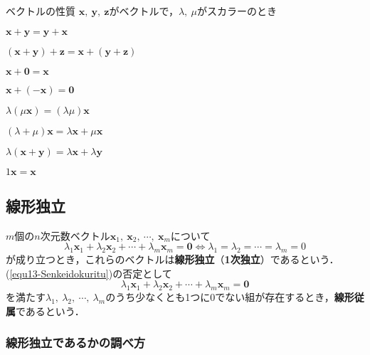 \begin{kousiki}{ベクトルの性質}
	$\bm{x},\ \bm{y},\ \bm{z}$がベクトルで，$\lambda,\ \mu$がスカラーのとき
	\begin{enumerate}[label=\textbf{[\arabic*]}, labelsep=10pt, leftmargin=23pt]
		\item $\bm{x} + \bm{y} = \bm{y} + \bm{x}$
		\item $(\bm{x} + \bm{y}) + \bm{z} = \bm{x} + (\bm{y} + \bm{z})$
		\item $\bm{x} + \bm{0} = \bm{x}$
		\item $\bm{x} + (-\bm{x}) = \bm{0}$
		\item $\lambda(\mu\bm{x}) = (\lambda\mu)\bm{x}$
		\item $(\lambda + \mu)\bm{x} = \lambda\bm{x} + \mu\bm{x}$
		\item $\lambda(\bm{x} + \bm{y}) = \lambda\bm{x} + \lambda\bm{y}$
		\item $1\bm{x} = \bm{x}$
	\end{enumerate}
\end{kousiki}



\subsection{線形独立}

$m$個の$n$次元数ベクトル$\bm{x}_1,\ \bm{x}_2,\ \cdots,\ \bm{x}_m$について
\begin{equation}
	\lambda_1\bm{x}_1 + \lambda_2\bm{x}_2 + \cdots + \lambda_m\bm{x}_m = \bm{0} \iff \lambda_1 = \lambda_2 = \cdots = \lambda_m = 0 \label{equ13-Senkeidokuritu}
\end{equation}
が成り立つとき，これらのベクトルは\textbf{線形独立}（\textbf{1次独立}）であるという．(\ref{equ13-Senkeidokuritu})の否定として
\begin{equation*}
	\lambda_1\bm{x}_1 + \lambda_2\bm{x}_2 + \cdots + \lambda_m\bm{x}_m = \bm{0}
\end{equation*}
を満たす$\lambda_1,\ \lambda_2,\ \cdots,\ \lambda_m$のうち少なくとも1つに$0$でない組が存在するとき，\textbf{線形従属}であるという．

\subsubsection*{線形独立であるかの調べ方}

